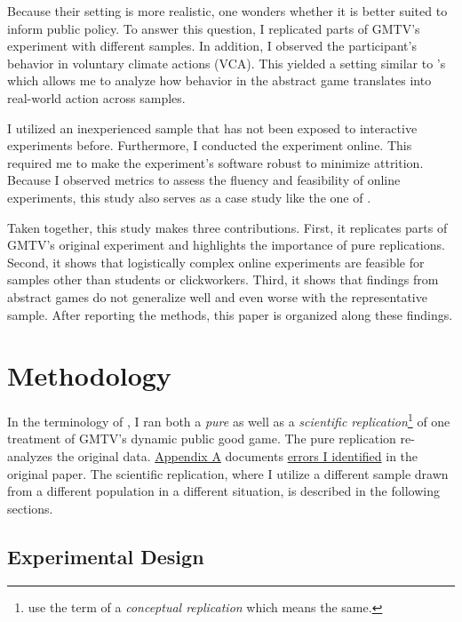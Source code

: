 \documentclass[
  authoryear,
  preprint,
  3p]{elsarticle}
\begin{document}
Because their setting is more realistic, one wonders whether it is
better suited to inform public policy. To answer this question, I
replicated parts of GMTV's experiment with different samples. In
addition, I observed the participant's behavior in voluntary climate
actions (VCA). This yielded a setting similar to \citet{GKLS2020}'s
which allows me to analyze how behavior in the abstract game translates
into real-world action across samples.

I utilized an inexperienced sample that has not been exposed to
interactive experiments before. Furthermore, I conducted the experiment
online. This required me to make the experiment's software robust to
minimize attrition. Because I observed metrics to assess the fluency and
feasibility of online experiments, this study also serves as a case
study like the one of \citet{AGM2018}.

Taken together, this study makes three contributions. First, it
replicates parts of GMTV's original experiment and highlights the
importance of pure replications. Second, it shows that logistically
complex online experiments are feasible for samples other than students
or clickworkers. Third, it shows that findings from abstract games do
not generalize well and even worse with the representative sample. After
reporting the methods, this paper is organized along these findings.

\hypertarget{sec-methods}{%
\section{Methodology}\label{sec-methods}}

In the terminology of \citet{Hamermesh2007}, I ran both a \emph{pure} as
well as a \emph{scientific replication}\footnote{\citet{Parsons2022} use
  the term of a \emph{conceptual replication} which means the same.} of
one treatment of GMTV's dynamic public good game. The pure replication
re-analyzes the original data.
\protect\hyperlink{A:-Pure-Replication}{Appendix A} documents
\href{}{errors I identified} in the original paper. The scientific
replication, where I utilize a different sample drawn from a different
population in a different situation, is described in the following
sections.

\hypertarget{sec-design}{%
\subsection{Experimental Design}\label{sec-design}}
\end{document}
